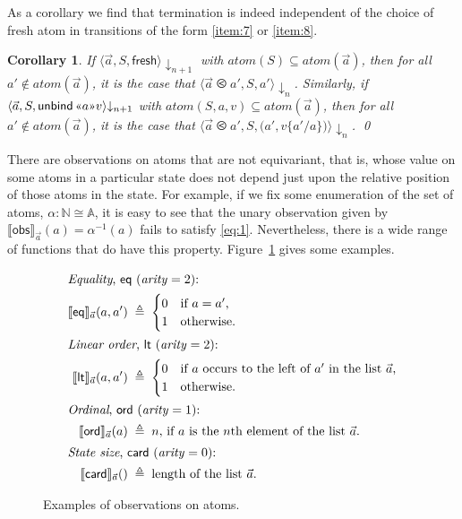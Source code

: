 \documentclass{LMCS}
\theoremstyle{plain}
\newtheorem{corollary}[thm]{Corollary}
\theoremstyle{definition}
\newcommand{\arity}{\mathit{arity}}
\newcommand{\atm}[1][a]{#1}
\newcommand{\Atom}{\mathbb{A}}
\newcommand{\atoms}{\mathit{atom}}
\newcommand{\bij}{\cong}
\newcommand{\BINDVAL}[2]{\mathopen{\text{\normalfont\guillemotleft}}#1
  \mathclose{\text{\normalfont\guillemotright}}#2}
\newcommand{\config}[3]{\langle#1, #2, #3\rangle}
\newcommand{\defeq}{\triangleq}
\newcommand{\den}[1]{\llbracket#1\rrbracket}\newcommand{\DIVERGE}{\kw{diverge}}
\newcommand{\FRESH}{\kw{fresh}}
\newcommand{\LP}{\mathopen{\kw{(}}}
\newcommand{\kw}[1]{\mathsf{#1}}
\newcommand{\NNO}{\mathbb{N}}
\newcommand{\OBS}[1][obs]{\kw{#1}}
\newcommand{\ords}{\olessthan}\newcommand{\PAIR}[2]{\LP#1\mathbin{\kw{,}}#2\RP}
\newcommand{\rename}[2]{\{#2/#1\}}
\newcommand{\RP}{\mathclose{\kw{)}}}
\newcommand{\s}[1][a]{\vec{#1}}
\newcommand{\stk}[1][S]{#1}
\newcommand{\terminates}[1][]{{\downarrow_{#1}}}
\newcommand{\UNBIND}{\kw{unbind}}
\newcommand{\val}[1][v]{#1}
\begin{document}
As a corollary we find that termination is indeed independent of the
choice of fresh atom in transitions of the form \ref{item:7} or
\ref{item:8}.

\begin{corollary}
  \label{cor:some-any}
  If $\config{\s}{\stk}{\FRESH}\terminates[n+1]$ with
  $\atoms(\stk)\subseteq\atoms(\s)$, then for all
  $\atm'\notin\atoms(\s)$, it is the case that
  $\config{\s\ords\atm'}{\stk}{\atm'}\terminates[n]$.  Similarly, if
  $\config{\s}{\stk}{\UNBIND\,\BINDVAL{\atm}{\val}}\terminates[n+1]$
  with $\atoms(\stk,\atm,\val)\subseteq\atoms(\s)$, then for all
  $\atm'\notin\atoms(\s)$, it is the case that
  $\config{\s\ords\atm'}{\stk}{\PAIR{\atm'}{\val\rename{\atm}{\atm'}}}\terminates[n]$.
  \qed
\end{corollary}

There are observations on atoms that are not equivariant, that is,
whose value on some atoms in a particular state does not depend just
upon the relative position of those atoms in the state. For example,
if we fix some enumeration of the set of atoms,
$\alpha:\NNO\bij\Atom$, it is easy to see that the unary observation
given by $\den{\OBS}_{\s}(\atm)=\alpha^{-1}(\atm)$ fails to satisfy
\eqref{eq:1}.  Nevertheless, there is a wide range of functions that
do have this property. Figure~\ref{fig:exaoa} gives some examples.

\begin{figure}\small
  \begin{align*}
    \intertext{\emph{Equality}, $\OBS[eq]$ ($\arity=2$):}
    \den{\OBS[eq]}_{\s}(\atm,\atm') &\;\defeq\;
    \begin{cases}
    0 &\text{if $\atm=\atm'$,}\\
    1 &\text{otherwise.}
  \end{cases}\\
  \intertext{\emph{Linear order}, $\OBS[lt]$ ($\arity=2$):}
  \den{\OBS[lt]}_{\s}(\atm,\atm') &\;\defeq\;
  \begin{cases}
    0 &\text{if $\atm$ occurs to the left of $\atm'$ in the list $\s$,}\\
    1 &\text{otherwise.}
  \end{cases}\\
  \intertext{\emph{Ordinal}, $\OBS[ord]$ ($\arity=1$):}
  \den{\OBS[ord]}_{\s}(\atm) &\;\defeq\;
  \text{$n$, if $\atm$ is the $n$th element of the list $\s$.}\\
  \intertext{\emph{State size}, $\OBS[card]$ ($\arity=0$):}
  \den{\OBS[card]}_{\s}() &\;\defeq\; \text{length of the list $\s$.}
  \end{align*}
  \caption{Examples of observations on atoms.}
  \label{fig:exaoa}
\end{figure}
\end{document}
